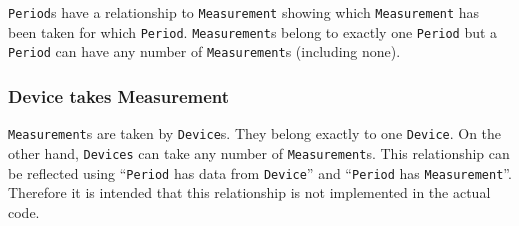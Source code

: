 \documentclass[fontsize=12pt,
               paper=a4,
               twoside=false,
               parskip=half,
               ]{scrartcl}
\begin{document}
\texttt{Period}s have a relationship to \texttt{Measurement} showing which \texttt{Measurement} has been taken for which \texttt{Period}. \texttt{Measurement}s belong to exactly one \texttt{Period} but a \texttt{Period} can have any number of \texttt{Measurement}s (including none).


\subsubsection{Device takes Measurement}

\texttt{Measurement}s are taken by \texttt{Device}s. They belong exactly to one \texttt{Device}. On the other hand, \texttt{Devices} can take any number of \texttt{Measurement}s. This relationship can be reflected using \enquote{\texttt{Period} has data from \texttt{Device}} and \enquote{\texttt{Period} has \texttt{Measurement}}. Therefore it is intended that this relationship is not implemented in the actual code.
\end{document}
